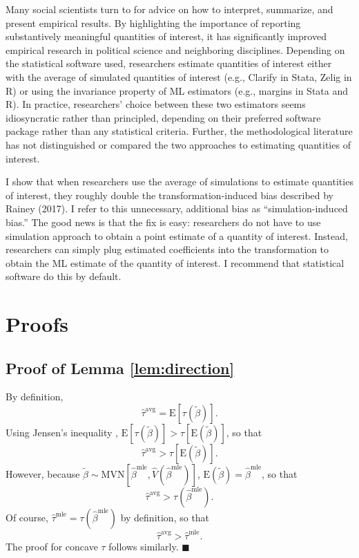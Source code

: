 \documentclass[12pt]{article}
\newenvironment{proof}[1][Proof]{\begin{trivlist}
\item[\hskip \labelsep {\bfseries #1}]}{\end{trivlist}}
\begin{document}
Many social scientists turn to \cite{KingTomzWittenberg2000} for advice on how to interpret, summarize, and present empirical results. By highlighting the importance of reporting substantively meaningful quantities of interest, it has significantly improved empirical research in political science and neighboring disciplines. Depending on the statistical software used, researchers estimate quantities of interest either with the average of simulated quantities of interest (e.g., Clarify in Stata, Zelig in R) or using the invariance property of ML estimators (e.g., margins in Stata and R). In practice, researchers' choice between these two estimators seems idiosyncratic rather than principled, depending on their preferred software package rather than any statistical criteria. Further, the methodological literature has not distinguished or compared the two approaches to estimating quantities of interest.

I show that when researchers use the average of simulations to estimate quantities of interest, they roughly double the transformation-induced bias described by Rainey (2017). I refer to this unnecessary, additional bias as ``simulation-induced bias.'' The good news is that the fix is easy: researchers do not have to use simulation approach to obtain a point estimate of a quantity of interest. Instead, researchers can simply plug estimated coefficients into the transformation to obtain the ML estimate of the quantity of interest. I recommend that statistical software do this by default.

\singlespace
\small



\newpage
\appendix

\section{Proofs}

\subsection{Proof of Lemma \ref{lem:direction}}

\begin{proof}
By definition, $$ \hat{\tau}^{\text{avg}} = \text{E}\left[ \tau \left(\tilde{\beta} \right) \right].$$
Using Jensen's inequality \citep[p.\@ 190, Thm.\@ 4.7.7]{CasellaBerger2002}, $\text{E}\left[ \tau \left(\tilde{\beta} \right) \right] > \tau \left[ \text{E}\left( \tilde{\beta} \right) \right]$, so that $$\hat{\tau}^{\text{avg}} > \tau \left[ \text{E}\left( \tilde{\beta} \right) \right].$$
However, because $\tilde{\beta} \sim \text{MVN} \left[ \hat{\beta}^{\text{mle}}, \hat{V} \left( \hat{\beta}^{\text{mle}} \right) \right]$, $\text{E}\left( \tilde{\beta} \right) = \hat{\beta}^\text{mle}$, so that
$$\hat{\tau}^{\text{avg}} > \tau \left( \hat{\beta}^\text{mle}\right).$$
Of course, $\hat{\tau}^\text{mle} = \tau \left( {\hat{\beta}^\text{mle}} \right)$ by definition, so that $$\hat{\tau}^{\text{avg}} > \hat{\tau}^\text{mle}.$$
The proof for concave $\tau$ follows similarly.
 $\blacksquare$
\end{proof}
\end{document}
